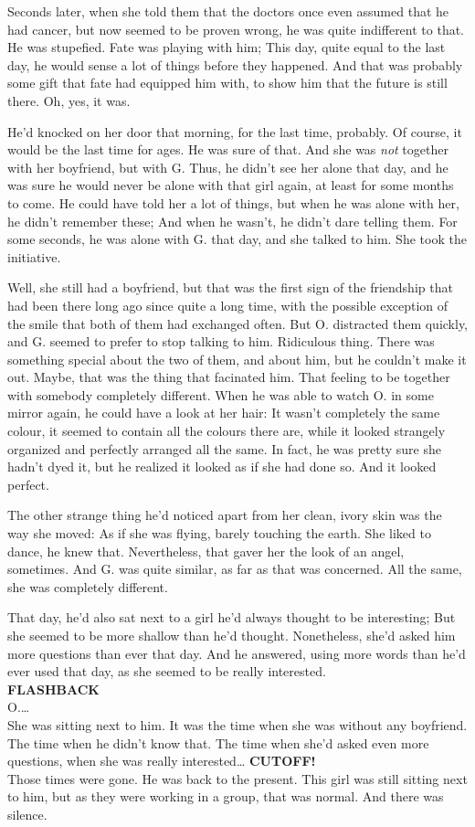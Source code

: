 Seconds later, when she told them that the doctors once even assumed that he had cancer, but now seemed to be proven wrong, he was quite indifferent to that. 
He was stupefied. 
Fate was playing with him; This day, quite equal to the last day, he would sense a lot of things before they happened. 
And that was probably some gift that fate had equipped him with, to show him that the future is still there. 
Oh, yes, it was.

He'd knocked on her door that morning, for the last time, probably. 
Of course, it would be the last time for ages. 
He was sure of that. 
And she was \emph{not} together with her boyfriend, but with G. 
Thus, he didn't see her alone that day, and he was sure he would never be alone with that girl again, at least for some months to come. 
He could have told her a lot of things, but when he was alone with her, he didn't remember these; And when he wasn't, he didn't dare telling them. 
For some seconds, he was alone with G. that day, and she talked to him. 
She took the initiative.

Well, she still had a boyfriend, but that was the first sign of the friendship that had been there long ago since quite a long time, with the possible exception of the smile that both of them had exchanged often. 
But O. distracted them quickly, and G. seemed to prefer to stop talking to him. 
Ridiculous thing. There was something special about the two of them, and about him, but he couldn't make it out. 
Maybe, that was the thing that facinated him. 
That feeling to be together with somebody completely different. 
When he was able to watch O. in some mirror again, he could have a look at her hair: It wasn't completely the same colour, it seemed to contain all the colours there are, while it looked strangely organized and perfectly arranged all the same. In fact, he was pretty sure she hadn't dyed it, but he realized it looked as if she had done so. 
And it looked perfect.

The other strange thing he'd noticed apart from her clean, ivory skin was the way she moved: As if she was flying, barely touching the earth. 
She liked to dance, he knew that. 
Nevertheless, that gaver her the look of an angel, sometimes. 
And G. was quite similar, as far as that was concerned. 
All the same, she was completely different.

That day, he'd also sat next to a girl he'd always thought to be interesting; But she seemed to be more shallow than he'd thought. 
Nonetheless, she'd asked him more questions than ever that day. 
And he answered, using more words than he'd ever used that day, as she seemed to be really interested.\\
\textbf{FLASHBACK}\\
O.\ldots\\
She was sitting next to him. 
It was the time when she was without any boyfriend. 
The time when he didn't know that. 
The time when she'd asked even more questions, when she was really interested\ldots
\textbf{CUTOFF!}\\
Those times were gone. 
He was back to the present. 
This girl was still sitting next to him, but as they were working in a group, that was normal. 
And there was silence.

